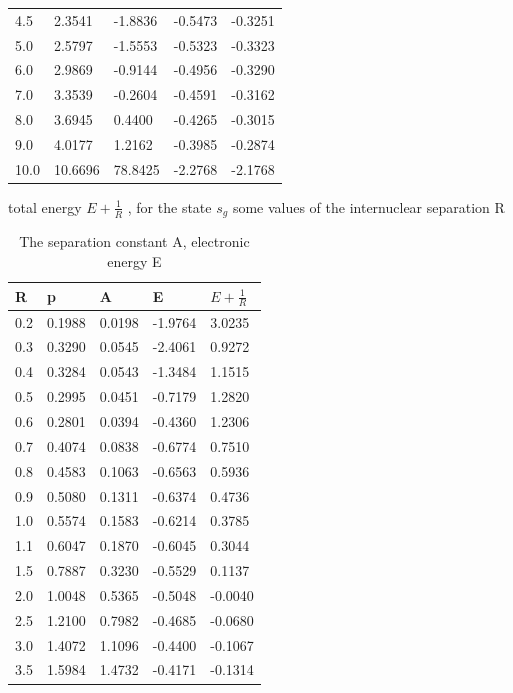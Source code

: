 \begin{table}[h]
\begin{tabular}{ m{6em} m{6em}  m{6em}  m{6em} m{6em} }
        4.5 & 2.3541 & -1.8836 & -0.5473 & -0.3251 \\
        5.0 & 2.5797 & -1.5553 & -0.5323 & -0.3323 \\
        6.0 & 2.9869 & -0.9144 & -0.4956 & -0.3290 \\
        7.0 & 3.3539 & -0.2604 & -0.4591 & -0.3162 \\
        8.0 & 3.6945 & 0.4400 & -0.4265 & -0.3015 \\
        9.0 & 4.0177 & 1.2162 & -0.3985 & -0.2874 \\
        10.0 & 10.6696 & 78.8425 & -2.2768 & -2.1768 \\
      \hline
      \end{tabular}
    \end{table}

  \begin{table}[h]
      \caption{ The separation constant A, electronic energy E}{ total energy $ E + \frac{1}{R} $ , for the state $ s_g $ some values of the internuclear separation R }
      \centering
        \begin{tabular}{ m{6em} m{6em}  m{6em}  m{6em} m{6em} }
		\hline
		    R & p & A & E & $ E + \frac{1}{R} $ \\ \hline \hline
        0.2 & 0.1988 & 0.0198 & -1.9764 & 3.0235 \\
        0.3 & 0.3290 & 0.0545 & -2.4061 & 0.9272 \\
        0.4 & 0.3284 & 0.0543 & -1.3484 & 1.1515 \\
        0.5 & 0.2995 & 0.0451 & -0.7179 & 1.2820 \\
        0.6 & 0.2801 & 0.0394 & -0.4360 & 1.2306 \\
        0.7 & 0.4074 & 0.0838 & -0.6774 & 0.7510 \\
        0.8 & 0.4583 & 0.1063 & -0.6563 & 0.5936 \\
        0.9 & 0.5080 & 0.1311 & -0.6374 & 0.4736 \\
        1.0 & 0.5574 & 0.1583 & -0.6214 & 0.3785 \\
        1.1 & 0.6047 & 0.1870 & -0.6045 & 0.3044 \\
        1.5 & 0.7887 & 0.3230 & -0.5529 & 0.1137 \\
        2.0 & 1.0048 & 0.5365 & -0.5048 & -0.0040 \\
        2.5 & 1.2100 & 0.7982 & -0.4685 & -0.0680 \\
        3.0 & 1.4072 & 1.1096 & -0.4400 & -0.1067 \\
        3.5 & 1.5984 & 1.4732 & -0.4171 & -0.1314 \\

\end{tabular}
\end{table}
